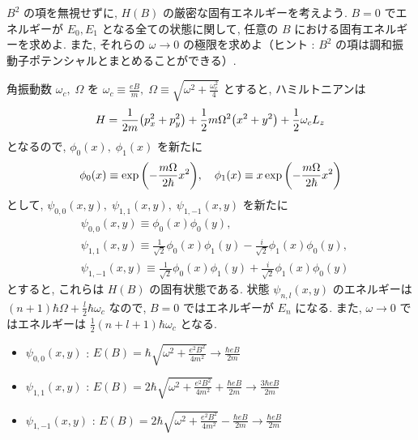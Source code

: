 \documentclass[../../ou-physics-exam.tex]{subfiles}
\begin{document}
$ B^2 $ の項を無視せずに, $ H(B) $ の厳密な固有エネルギーを考えよう. 
$ B = 0 $ でエネルギーが $ E_0, E_1 $ となる全ての状態に関して, 任意の $ B $ における固有エネルギーを求めよ. 
また, それらの $ \omega \to 0 $ の極限を求めよ（ヒント : $ B^2 $ の項は調和振動子ポテンシャルとまとめることができる）.
\begin{answer}
    角振動数 $ \omega_c ,\; \Omega $ を $ \displaystyle \omega_c \equiv \frac{eB}{m}, \; \Omega \equiv \sqrt{\omega^2 + \frac{\omega_c^2}{4}} $ とすると, ハミルトニアンは
    \begin{align*}
        H = \frac{1}{2m} \qty(p_x^2 + p_y^2) + \frac{1}{2} m \Omega^2 \qty(x^2 + y^2) + \frac{1}{2} \omega_c L_z
    \end{align*}
    となるので, $ \phi_0 (x), \; \phi_1 (x) $ を新たに
    \begin{align*}
        \phi_0 (x) \equiv \exp \qty(- \frac{m \Omega}{2 \hbar} x^2), \quad \phi_1 (x) \equiv x \exp \qty(- \frac{m \Omega}{2 \hbar} x^2)
    \end{align*}
    として, $ \psi_{0, 0} (x, y), \; \psi_{1, 1} (x, y), \; \psi_{1, -1} (x, y) $ を新たに
    \begin{align*}
        & \psi_{0, 0} (x, y) \equiv \phi_0 (x) \phi_0 (y), \\
        & \psi_{1, 1} (x, y) \equiv \frac{1}{\sqrt{2}} \phi_0 (x) \phi_1 (y) - \frac{i}{\sqrt{2}} \phi_1 (x) \phi_0 (y), \\
        & \psi_{1, -1} (x, y) \equiv \frac{1}{\sqrt{2}} \phi_0 (x) \phi_1 (y) + \frac{i}{\sqrt{2}} \phi_1 (x) \phi_0 (y)
    \end{align*}
    とすると, これらは $ H(B) $ の固有状態である. 
    状態 $ \psi_{n, l} (x, y) $ のエネルギーは $ \displaystyle (n+1) \hbar \Omega + \frac{l}{2} \hbar \omega_c $ なので, $ B = 0 $ ではエネルギーが $ E_n $ になる. 
    また, $ \omega \to 0 $ ではエネルギーは $ \displaystyle \frac{1}{2} (n + l + 1) \hbar \omega_c $ となる.
    \begin{itemize}
        \item $ \psi_{0, 0} (x, y) $ : $ \displaystyle E(B) = \hbar \sqrt{\omega^2 + \frac{e^2B^2}{4m^2}} \to \frac{\hbar eB}{2m} $ \\[2mm]
        \item $ \psi_{1, 1} (x, y) $ : $ \displaystyle E(B) = 2 \hbar \sqrt{\omega^2 + \frac{e^2B^2}{4m^2}} + \frac{\hbar eB}{2m} \to \frac{3 \hbar eB}{2m} $ \\[2mm]
        \item $ \psi_{1, -1} (x, y) $ : $ \displaystyle E(B) = 2 \hbar \sqrt{\omega^2 + \frac{e^2B^2}{4m^2}} - \frac{\hbar eB}{2m} \to \frac{\hbar eB}{2m} $
    \end{itemize}
\end{answer}
\end{document}
